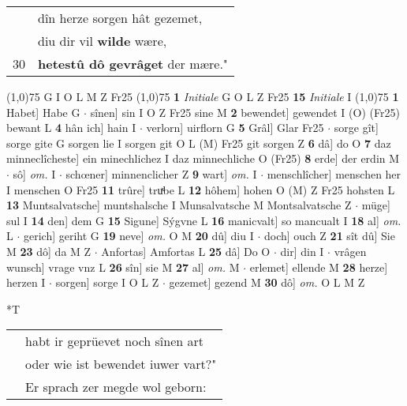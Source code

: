 \documentclass[8pt,a4paper,notitlepage]{article}
\begin{document}
\begin{table}[ht]
\begin{minipage}[t]{0.5\linewidth}
\begin{tabular}{rl}
 & dîn herze sorgen hât gezemet,\\ 
 & diu dir vil \textbf{wilde} wære,\\ 
30 & \textbf{hetestû dô gevrâget} der mære."\\ 
\end{tabular}
\scriptsize
\line(1,0){75} \newline
G I O L M Z Fr25 \newline
\line(1,0){75} \newline
\textbf{1} \textit{Initiale} G O L Z Fr25  \textbf{15} \textit{Initiale} I  \newline
\line(1,0){75} \newline
\textbf{1} Habet] Habe G  $\cdot$ sînen] sin I O Z Fr25 sine M \textbf{2} bewendet] gewendet I (O) (Fr25) bewant L \textbf{4} hân ich] hain I  $\cdot$ verlorn] uirflorn G \textbf{5} Grâl] Glar Fr25  $\cdot$ sorge gît] sorge gite G sorgen lie I sorgen git O L (M) Fr25 git sorgen Z \textbf{6} dâ] do O \textbf{7} daz minneclîcheste] ein minechlichez I daz minnechliche O (Fr25) \textbf{8} erde] der erdin M  $\cdot$ sô] \textit{om.} I  $\cdot$ schœner] minnenclicher Z \textbf{9} wart] \textit{om.} I  $\cdot$ menschlîcher] menschen her I menschen O Fr25 \textbf{11} trûre] truͯbe L \textbf{12} hôhem] hohen O (M) Z Fr25 hohsten L \textbf{13} Muntsalvatsche] muntshalsche I Munsalvatsche M Montsalvatsche Z  $\cdot$ müge] sul I \textbf{14} den] dem G \textbf{15} Sigune] Sýgvne L \textbf{16} manicvalt] so mancualt I \textbf{18} al] \textit{om.} L  $\cdot$ gerich] geriht G \textbf{19} neve] \textit{om.} O M \textbf{20} dû] diu I  $\cdot$ doch] ouch Z \textbf{21} sît dû] Sie M \textbf{23} dô] da M Z  $\cdot$ Anfortas] Amfortas L \textbf{25} dâ] Do O  $\cdot$ dir] din I  $\cdot$ vrâgen wunsch] vrage vnz L \textbf{26} sîn] sie M \textbf{27} al] \textit{om.} M  $\cdot$ erlemet] ellende M \textbf{28} herze] herzen I  $\cdot$ sorgen] sorge I O L Z  $\cdot$ gezemet] gezend M \textbf{30} dô] \textit{om.} O L M Z \newline
\end{minipage}
\hspace{0.5cm}
\begin{minipage}[t]{0.5\linewidth}
\small
\begin{center}*T
\end{center}
\begin{tabular}{rl}
 & habt ir geprüevet noch sînen art\\ 
 & oder wie ist bewendet iuwer vart?"\\ 
 & Er sprach zer megde wol geborn:\\ 

\end{tabular}
\end{minipage}
\end{table}
\end{document}
